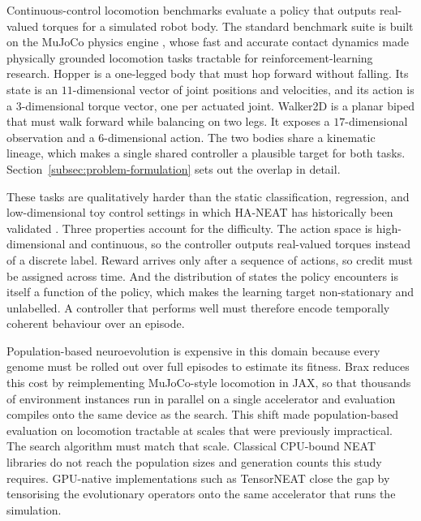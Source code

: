 Continuous-control locomotion benchmarks evaluate a policy that outputs real-valued torques for a simulated robot body.
The standard benchmark suite \parencite{brockman_openai_2016,duan_benchmarking_2016} is built on the MuJoCo physics engine \parencite{todorov_mujoco_2012}, whose fast and accurate contact dynamics made physically grounded locomotion tasks tractable for reinforcement-learning research.
Hopper is a one-legged body that must hop forward without falling. Its state is an $11$-dimensional vector of joint positions and velocities, and its action is a $3$-dimensional torque vector, one per actuated joint.
Walker2D is a planar biped that must walk forward while balancing on two legs. It exposes a $17$-dimensional observation and a $6$-dimensional action.
The two bodies share a kinematic lineage, which makes a single shared controller a plausible target for both tasks. Section~\ref{subsec:problem-formulation} sets out the overlap in detail.

These tasks are qualitatively harder than the static classification, regression, and low-dimensional toy control settings in which HA-NEAT has historically been validated \parencite{hagg_evolving_2017}.
Three properties account for the difficulty.
The action space is high-dimensional and continuous, so the controller outputs real-valued torques instead of a discrete label.
Reward arrives only after a sequence of actions, so credit must be assigned across time.
And the distribution of states the policy encounters is itself a function of the policy, which makes the learning target non-stationary and unlabelled.
A controller that performs well must therefore encode temporally coherent behaviour over an episode.

Population-based neuroevolution is expensive in this domain because every genome must be rolled out over full episodes to estimate its fitness.
Brax \parencite{freeman_brax_2021} reduces this cost by reimplementing MuJoCo-style locomotion in JAX, so that thousands of environment instances run in parallel on a single accelerator and evaluation compiles onto the same device as the search.
This shift made population-based evaluation on locomotion tractable at scales that were previously impractical.
The search algorithm must match that scale.
Classical CPU-bound NEAT libraries do not reach the population sizes and generation counts this study requires.
GPU-native implementations such as TensorNEAT \parencite{wang_tensorized_2024} close the gap by tensorising the evolutionary operators onto the same accelerator that runs the simulation.

